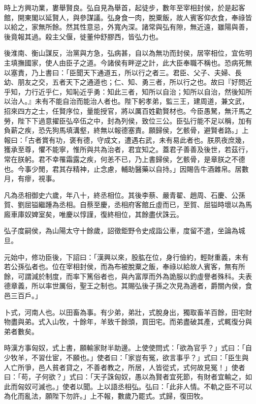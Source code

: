 \begin{pinyinscope}
時上方興功業，婁舉賢良。弘自見為舉首，起徒步，數年至宰相封侯，於是起客館，開東閣以延賢人，與參謀議。弘身食一肉，脫粟飯，故人賓客仰衣食，奉祿皆以給之，家無所餘。然其性意忌，外寬內深。諸常與弘有隙，無近遠，雖陽與善，後竟報其過。殺主父偃，徙董仲舒膠西，皆弘力也。

後淮南、衡山謀反，治黨與方急，弘病甚，自以為無功而封侯，居宰相位，宜佐明主填撫國家，使人由臣子之道。今諸侯有畔逆之計，此大臣奉職不稱也。恐病死無以塞責，乃上書曰：「臣聞天下通道五，所以行之者三。君臣、父子、夫婦、長幼、朋友之交，五者天下之通道也；仁、知、勇三者，所以行之也。故曰『好問近乎知，力行近乎仁，知恥近乎勇：知此三者，知所以自治；知所以自治，然後知所以治人。』未有不能自治而能治人者也。陛下躬孝弟，監三王，建周道，兼文武，招來四方之士，任賢序位，量能授官，將以厲百姓勸賢材也。今臣愚駑，無汗馬之勞，陛下下過意擢臣弘卒伍之中，封為列侯，致位三公。臣弘行能不足以稱，加有負薪之疾，恐先狗馬填溝壑，終無以報德塞責。願歸侯，乞骸骨，避賢者路。」上報曰：「古者賞有功，褒有德，守成文，遭遇右武，未有易此者也。朕夙夜庶幾，獲承至尊，懼不能寧，惟所與共為治者，君宜知之。蓋君子善善及後世，若茲行，常在朕躬。君不幸罹霜露之疾，何恙不已，乃上書歸侯，乞骸骨，是章朕之不德也。今事少閒，君其存精神，止念慮，輔助醫藥以自持。」因賜告牛酒雜帛。居數月，有瘳，視事。

凡為丞相御史六歲，年八十，終丞相位。其後李蔡、嚴青翟、趙周、石慶、公孫賀、劉屈镒繼踵為丞相。自蔡至慶，丞相府客館丘虛而已，至賀、屈镒時壞以為馬廄車庫奴婢室矣，唯慶以惇謹，復終相位，其餘盡伏誅云。

弘子度嗣侯，為山陽太守十餘歲，詔徵鉅野令史成詣公車，度留不遣，坐論為城旦。

元始中，修功臣後，下詔曰：「漢興以來，股肱在位，身行儉約，輕財重義，未有若公孫弘者也。位在宰相封侯，而為布被脫粟之飯，奉祿以給故人賓客，無有所餘，可謂減於制度，而率下篤俗者也，與內富厚而外為詭服以釣虛譽者殊科。夫表德章義，所以率世厲俗，聖王之制也。其賜弘後子孫之次見為適者，爵關內侯，食邑三百戶。」

卜式，河南人也。以田畜為事。有少弟，弟壯，式脫身出，獨取畜羊百餘，田宅財物盡與弟。式入山牧，十餘年，羊致千餘頭，買田宅。而弟盡破其產，式輒復分與弟者數矣。

時漢方事匈奴，式上書，願輸家財半助邊。上使使問式：「欲為官乎？」式曰：「自少牧羊，不習仕宦，不願也。」使者曰：「家豈有冤，欲言事乎？」式曰：「臣生與人亡所爭，邑人貧者貸之，不善者教之，所居，人皆從式，式何故見冤！」使者曰：「苟，子何欲？」式曰：「天子誅匈奴，愚以為賢者宜死節，有財者宜輸之，如此而匈奴可滅也。」使者以聞。上以語丞相弘。弘曰：「此非人情。不軌之臣不可以為化而亂法，願陛下勿許。」上不報，數歲乃罷式。式歸，復田牧。


\end{pinyinscope}
